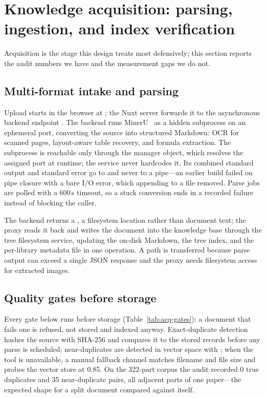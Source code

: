 \section{Knowledge acquisition: parsing, ingestion, and index verification}
\label{sec:acquisition}

Acquisition is the stage this design treats most defensively; this
section reports the audit numbers we have and the measurement gaps we do
not.

\subsection{Multi-format intake and parsing}

Upload starts in the browser at ;
the Nuxt server forwards it to the asynchronous backend endpoint
. The backend runs MinerU~\citep{mineru}
as a hidden subprocess on an ephemeral port, converting the source into
structured Markdown: OCR for scanned pages, layout-aware table recovery,
and formula extraction. The subprocess is reachable only through the
manager object, which resolves the assigned port at runtime; the service
never hardcodes it.
Its combined standard output and standard error go to
 and never to a pipe---an earlier
build failed on pipe closure with a bare I/O error, which appending to a
file removed. Parse jobs are polled with a 600\,s timeout, so a stuck
conversion ends in a recorded failure instead of blocking the caller.

The backend returns a , a filesystem location
rather than document text; the proxy reads it back and writes the
document into the knowledge base through the tree filesystem service,
updating the on-disk Markdown, the tree index, and the per-library
metadata file in one operation. A path is transferred because parse
output can exceed a single JSON response and the proxy needs filesystem
access for extracted images.

\subsection{Quality gates before storage}

Every gate below runs before storage (Table~\ref{tab:acq-gates}): a
document that fails one is
refused, not stored and indexed anyway. Exact-duplicate detection hashes
the source with SHA-256 and compares it to the stored records before any
parse is scheduled; near-duplicates are detected in vector space with
; when the tool is
unavailable, a manual fallback channel matches filename and file size
and probes the vector store at 0.85. On the 322-part corpus the audit
recorded 0 true duplicates and 35 near-duplicate pairs, all adjacent
parts of one paper---the expected shape for a split document compared
against itself.

